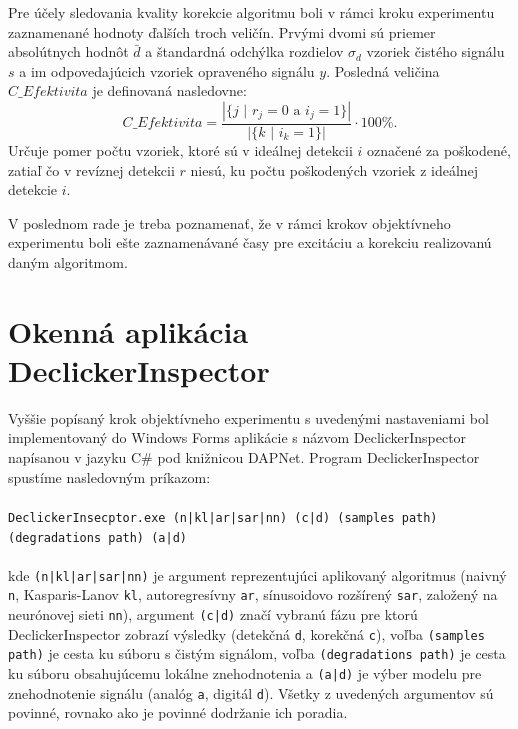 Pre účely sledovania kvality korekcie algoritmu boli v rámci kroku experimentu zaznamenané hodnoty ďalších troch veličín. Prvými dvomi sú priemer absolútnych hodnôt $\bar{d}$ a štandardná odchýlka rozdielov $\sigma_d$ vzoriek čistého signálu $s$ a im odpovedajúcich vzoriek opraveného signálu $y$. Posledná veličina $C\_Efektivita$ je definovaná nasledovne:
$$C\_Efektivita = \frac{| \{\text{$j$ | $r_j=0 $ a $i_j=1$} \} |}{| \{\text{$k$ | $i_k=1$} \} |} \cdot 100\%.$$
Určuje pomer počtu vzoriek, ktoré sú v ideálnej detekcii $i$ označené za poškodené, zatiaľ čo v revíznej detekcii $r$ niesú, ku počtu poškodených vzoriek z ideálnej detekcie $i$. 

V poslednom rade je treba poznamenať, že v rámci krokov objektívneho experimentu boli ešte zaznamenávané časy pre excitáciu a korekciu realizovanú daným algoritmom.


\section{Okenná aplikácia DeclickerInspector}
Vyššie popísaný krok objektívneho experimentu s uvedenými nastaveniami bol implementovaný do Windows Forms aplikácie s názvom DeclickerInspector napísanou v jazyku C\# pod knižnicou DAPNet. Program DeclickerInspector spustíme nasledovným príkazom:\\
\\
\texttt{DeclickerInsecptor.exe (n|kl|ar|sar|nn) (c|d) (samples path) (degradations path) (a|d)}\\
\\
kde \texttt{(n|kl|ar|sar|nn)} je argument reprezentujúci aplikovaný algoritmus (naivný \texttt{n}, Kasparis-Lanov \texttt{kl}, autoregresívny \texttt{ar}, sínusoidovo rozšírený \texttt{sar}, založený na neurónovej sieti \texttt{nn}), argument \texttt{(c|d)} značí vybranú fázu pre ktorú DeclickerInspector zobrazí výsledky (detekčná \texttt{d}, korekčná \texttt{c}), voľba \texttt{(samples path)} je cesta ku súboru s čistým signálom, voľba \texttt{(degradations path)} je cesta ku súboru obsahujúcemu lokálne znehodnotenia a \texttt{(a|d)} je výber modelu pre znehodnotenie signálu (analóg \texttt{a}, digitál \texttt{d}). Všetky z uvedených argumentov sú povinné, rovnako ako je povinné dodržanie ich poradia. 

